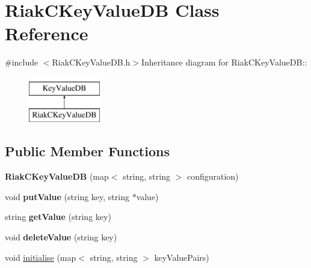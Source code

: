 \hypertarget{classRiakCKeyValueDB}{
\section{RiakCKeyValueDB Class Reference}
\label{classRiakCKeyValueDB}
}


{\ttfamily \#include $<$RiakCKeyValueDB.h$>$}Inheritance diagram for RiakCKeyValueDB::\begin{figure}[H]
\begin{center}
\leavevmode
\includegraphics[height=2cm]{classRiakCKeyValueDB}
\end{center}
\end{figure}
\subsection*{Public Member Functions}
\begin{DoxyCompactItemize}
\item 
\hypertarget{classRiakCKeyValueDB_ad035ea0943d0ce5d1ee2fae2a13f6b78}{
{\bfseries RiakCKeyValueDB} (map$<$ string, string $>$ configuration)}
\label{classRiakCKeyValueDB_ad035ea0943d0ce5d1ee2fae2a13f6b78}

\item 
\hypertarget{classRiakCKeyValueDB_a651f7b83c0ae06751515661cc863ca6b}{
void {\bfseries putValue} (string key, string $\ast$value)}
\label{classRiakCKeyValueDB_a651f7b83c0ae06751515661cc863ca6b}

\item 
\hypertarget{classRiakCKeyValueDB_aa94128187a465b6526192e1d06fb084c}{
string {\bfseries getValue} (string key)}
\label{classRiakCKeyValueDB_aa94128187a465b6526192e1d06fb084c}

\item 
\hypertarget{classRiakCKeyValueDB_a513f70656d6b625bb48bf24721a3cac9}{
void {\bfseries deleteValue} (string key)}
\label{classRiakCKeyValueDB_a513f70656d6b625bb48bf24721a3cac9}

\item 
void \hyperlink{classRiakCKeyValueDB_ac57a6fe1e7b1d5759dcb43915d4f65da}{initialise} (map$<$ string, string $>$ keyValuePairs)
\end{DoxyCompactItemize}


